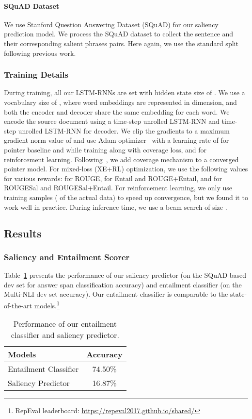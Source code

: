 \documentclass[11pt,a4paper]{article}
\begin{document}
\paragraph{SQuAD Dataset}
We use Stanford Question Answering Dataset (SQuAD) for our saliency prediction model. We process the SQuAD dataset to collect the sentence and their corresponding salient phrases pairs. Here again, we use the standard split following previous work.


\subsubsection{Training Details}
\label{subsec:suppl:training-details}
During training, all our LSTM-RNNs are set with hidden state size of . We use a vocabulary size of , where word embeddings are represented in  dimension, and both the encoder and decoder share the same embedding for each word. We encode the source document using a  time-step unrolled LSTM-RNN and  time-step unrolled LSTM-RNN for decoder. We clip the gradients to a maximum gradient norm value of  and use Adam optimizer~\cite{kingma2014adam} with a learning rate of  for pointer baseline and  while training along with coverage loss, and  for reinforcement learning. Following~, we add coverage mechanism to a converged pointer model. For mixed-loss (XE+RL) optimization, we use the following  values for various rewards:  for ROUGE,  for Entail and ROUGE+Entail, and  for ROUGESal and ROUGESal+Entail. For reinforcement learning, we only use  training samples ( of the actual data) to speed up convergence, but we found it to work well in practice. During inference time, we use a beam search of size .



\subsection{Results}

\subsubsection{Saliency and Entailment Scorer}
Table~\ref{table:entailment_saliency_predictor} presents the performance of our saliency predictor (on the SQuAD-based dev set for answer span classification accuracy) and entailment classifier (on the Multi-NLI dev set accuracy). Our entailment classifier is comparable to the state-of-the-art models.\footnote{RepEval leaderboard: \url{https://repeval2017.github.io/shared/}} 
\begin{table}
\begin{center}
\begin{tabular}{|l|c|}
\hline
Models & Accuracy \\
\hline
Entailment Classifier & 74.50\% \\
Saliency Predictor & 16.87\% \\
\hline
\end{tabular}
\end{center}
\caption{Performance of our entailment classifier and saliency predictor.}
\label{table:entailment_saliency_predictor}
\end{table}
\end{document}
